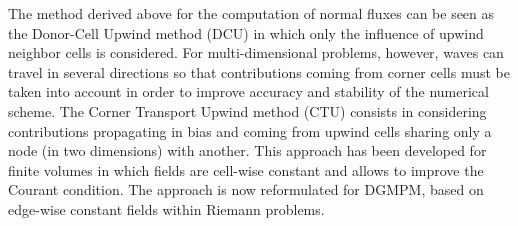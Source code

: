 The method derived above for the computation of normal fluxes can be seen as the Donor-Cell Upwind method (DCU) \cite{Leveque} in which only the influence of upwind neighbor cells is considered.
For multi-dimensional problems, however, waves can travel in several directions so that contributions coming from corner cells must be taken into account in order to improve accuracy and stability of the numerical scheme.
The Corner Transport Upwind method (CTU) \cite{Colella_CTU} consists in considering contributions propagating in bias and coming from upwind cells sharing only a node (in two dimensions) with another.
This approach has been developed for finite volumes in which fields are cell-wise constant and allows to improve the Courant condition.
The approach is now reformulated for DGMPM, based on edge-wise constant fields within Riemann problems.

